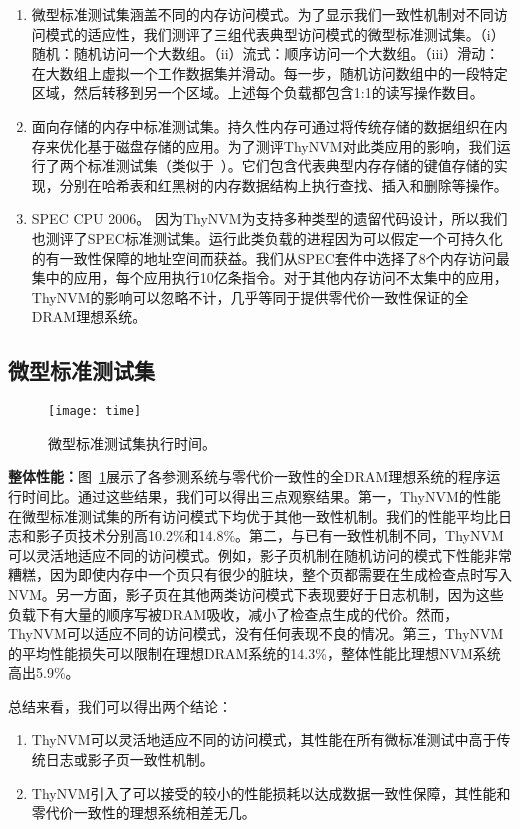 \begin{enumerate}
\item 微型标准测试集涵盖不同的内存访问模式。为了显示我们一致性机制对不同访问模式的适应性，我们测评了三组代表典型访问模式的微型标准测试集。（i）随机：随机访问一个大数组。（ii）流式：顺序访问一个大数组。（iii）滑动：在大数组上虚拟一个工作数据集并滑动。每一步，随机访问数组中的一段特定区域，然后转移到另一个区域。上述每个负载都包含1:1的读写操作数目。
\item 面向存储的内存中标准测试集。持久性内存可通过将传统存储的数据组织在内存来优化基于磁盘存储的应用。为了测评ThyNVM对此类应用的影响，我们运行了两个标准测试集（类似于~\cite{Coburn:2011:NMP:1950365.1950380, Zhao:2013:KCP:2540708.2540744}）。它们包含代表典型内存存储的键值存储的实现，分别在哈希表和红黑树的内存数据结构上执行查找、插入和删除等操作。 
\item SPEC CPU 2006。 因为ThyNVM为支持多种类型的遗留代码设计，所以我们也测评了SPEC标准测试集。运行此类负载的进程因为可以假定一个可持久化的有一致性保障的地址空间而获益。我们从SPEC套件中选择了8个内存访问最集中的应用，每个应用执行10亿条指令。对于其他内存访问不太集中的应用，ThyNVM的影响可以忽略不计，几乎等同于提供零代价一致性保证的全DRAM理想系统。 
\end{enumerate}

\subsection{微型标准测试集}

\begin{figure}[!h]
  \centering
  \texttt{[image: time]}
  \caption{微型标准测试集执行时间。}
  \label{fig:micro-time}
\end{figure}

\textbf{整体性能：}图~\ref{fig:micro-time}展示了各参测系统与零代价一致性的全DRAM理想系统的程序运行时间比。通过这些结果，我们可以得出三点观察结果。第一，ThyNVM的性能在微型标准测试集的所有访问模式下均优于其他一致性机制。我们的性能平均比日志和影子页技术分别高10.2\%和14.8\%。第二，与已有一致性机制不同，ThyNVM可以灵活地适应不同的访问模式。例如，影子页机制在随机访问的模式下性能非常糟糕，因为即使内存中一个页只有很少的脏块，整个页都需要在生成检查点时写入NVM。另一方面，影子页在其他两类访问模式下表现要好于日志机制，因为这些负载下有大量的顺序写被DRAM吸收，减小了检查点生成的代价。然而，ThyNVM可以适应不同的访问模式，没有任何表现不良的情况。第三，ThyNVM的平均性能损失可以限制在理想DRAM系统的14.3\%，整体性能比理想NVM系统高出5.9\%。

总结来看，我们可以得出两个结论：
\begin{enumerate}
\item ThyNVM可以灵活地适应不同的访问模式，其性能在所有微标准测试中高于传统日志或影子页一致性机制。 
\item ThyNVM引入了可以接受的较小的性能损耗以达成数据一致性保障，其性能和零代价一致性的理想系统相差无几。
\end{enumerate}


